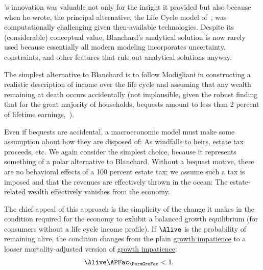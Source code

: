 \documentclass[BufferStockTheory]{subfiles}
\begin{document}

\hypertarget{Modigliani-Lives}{}

\cite{blanchardFinite}'s innovation was valuable not only for the insight it provided but also because when he wrote, the principal alternative, the Life Cycle model of~\cite{modiglianiWealth}, was computationally challenging given then-available technologies.
Despite its (considerable) conceptual value, Blanchard's analytical solution is now rarely used because essentially all modern modeling incorporates uncertainty, constraints, and other features that rule out analytical solutions anyway.%

The simplest alternative to Blanchard is to follow Modigliani in constructing a realistic description of income over the life cycle and assuming that any wealth remaining at death occurs accidentally (not implausible, given the robust finding that for the great majority of households, bequests amount to less than 2 percent of lifetime earnings,~\cite{hendricksBequests,hendricksSmallBequests}).

Even if bequests are accidental, a macroeconomic model must make some assumption about how they are disposed of: As windfalls to heirs, estate tax proceeds, etc.
We again consider the simplest choice, because it represents something of a polar alternative to Blanchard.
Without a bequest motive, there are no behavioral effects of a 100 percent estate tax; we assume such a tax is imposed and that the revenues are effectively thrown in the ocean:  The estate-related wealth effectively vanishes from the economy.

The chief appeal of this approach is the simplicity of the change it makes in the condition required for the economy to exhibit a balanced growth equilibrium (for consumers without a life cycle income profile).
If $\Alive$ is the probability of remaining alive, the condition changes from the plain \hyperlink{GIC}{growth impatience} to a looser mortality-adjusted version of \hyperlink{GIC}{growth impatience}:
\hypertarget{GICLivModDefn}{}
\begin{align}
  \Alive  \APFac_{\PermGroFac} & < 1. \label{eq:GICLivMod}
\end{align}
\end{document}
